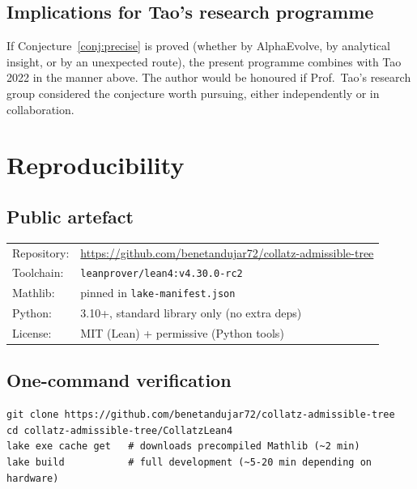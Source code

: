 \documentclass[11pt,a4paper]{article}
\theoremstyle{plain}
\theoremstyle{definition}
\begin{document}
\subsection{Implications for Tao's research programme}

If Conjecture~\ref{conj:precise} is proved (whether by
AlphaEvolve, by analytical insight, or by an unexpected route),
the present programme combines with Tao 2022 in the manner above.
The author would be honoured if Prof.\ Tao's research group
considered the conjecture worth pursuing, either independently or
in collaboration.

\appendix

\section{Reproducibility}\label{app:reprod}

\subsection*{Public artefact}

\begin{tabular}{ll}
Repository: & \url{https://github.com/benetandujar72/collatz-admissible-tree} \\
Toolchain:  & \texttt{leanprover/lean4:v4.30.0-rc2} \\
Mathlib:    & pinned in \texttt{lake-manifest.json} \\
Python:     & 3.10+, standard library only (no extra deps) \\
License:    & MIT (Lean) + permissive (Python tools) \\
\end{tabular}

\subsection*{One-command verification}

\begin{lstlisting}
git clone https://github.com/benetandujar72/collatz-admissible-tree
cd collatz-admissible-tree/CollatzLean4
lake exe cache get   # downloads precompiled Mathlib (~2 min)
lake build           # full development (~5-20 min depending on hardware)
\end{lstlisting}
\end{document}

